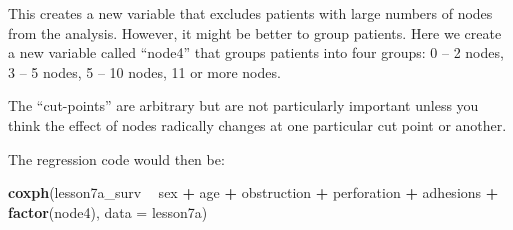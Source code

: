 \documentclass[]{book}
\newenvironment{Shaded}{\begin{snugshade}}{\end{snugshade}}
\newcommand{\DataTypeTok}[1]{\textcolor[rgb]{0.13,0.29,0.53}{#1}}
\newcommand{\DecValTok}[1]{\textcolor[rgb]{0.00,0.00,0.81}{#1}}
\newcommand{\KeywordTok}[1]{\textcolor[rgb]{0.13,0.29,0.53}{\textbf{#1}}}
\newcommand{\NormalTok}[1]{#1}
\newcommand{\OperatorTok}[1]{\textcolor[rgb]{0.81,0.36,0.00}{\textbf{#1}}}
\newcommand{\StringTok}[1]{\textcolor[rgb]{0.31,0.60,0.02}{#1}}
\begin{document}
This creates a new variable that excludes patients with large numbers of
nodes from the analysis. However, it might be better to group patients.
Here we create a new variable called ``node4'' that groups patients into
four groups: 0 -- 2 nodes, 3 -- 5 nodes, 5 -- 10 nodes, 11 or more
nodes.

\begin{Shaded}
\end{Shaded}

The ``cut-points'' are arbitrary but are not particularly important
unless you think the effect of nodes radically changes at one particular
cut point or another.

The regression code would then be:

\begin{Shaded}
\begin{Highlighting}[]
\KeywordTok{coxph}\NormalTok{(lesson7a_surv }\OperatorTok{~}\StringTok{ }\NormalTok{sex }\OperatorTok{+}\StringTok{ }\NormalTok{age }\OperatorTok{+}\StringTok{ }\NormalTok{obstruction }\OperatorTok{+}\StringTok{ }\NormalTok{perforation }\OperatorTok{+}\StringTok{ }\NormalTok{adhesions }\OperatorTok{+}\StringTok{ }\KeywordTok{factor}\NormalTok{(node4),}
      \DataTypeTok{data =}\NormalTok{ lesson7a)}
\end{Highlighting}
\end{Shaded}
\end{document}
